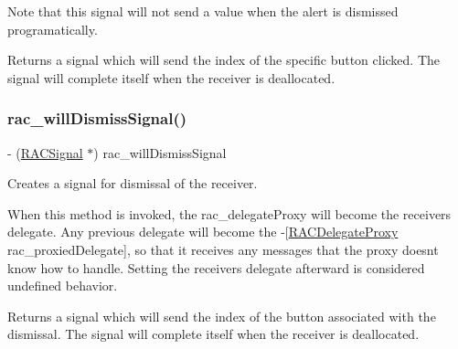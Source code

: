 Note that this signal will not send a value when the alert is dismissed programatically.

Returns a signal which will send the index of the specific button clicked. The signal will complete itself when the receiver is deallocated. \mbox{\label{category_u_i_alert_view_07_r_a_c_signal_support_08_aa0ae17a8658125f05c58f479cbaf2472}} 
\subsubsection{\texorpdfstring{rac\+\_\+will\+Dismiss\+Signal()}{rac\_willDismissSignal()}\hspace{0.1cm}{\footnotesize\ttfamily [1/3]}}
{\footnotesize\ttfamily -\/ (\mbox{\hyperlink{interface_r_a_c_signal}{R\+A\+C\+Signal}} $\ast$) rac\+\_\+will\+Dismiss\+Signal \begin{DoxyParamCaption}{ }\end{DoxyParamCaption}}

Creates a signal for dismissal of the receiver.

When this method is invoked, the {\ttfamily rac\+\_\+delegate\+Proxy} will become the receiver\textquotesingle{}s delegate. Any previous delegate will become the -\/\mbox{[}\mbox{\hyperlink{interface_r_a_c_delegate_proxy}{R\+A\+C\+Delegate\+Proxy}} rac\+\_\+proxied\+Delegate\mbox{]}, so that it receives any messages that the proxy doesn\textquotesingle{}t know how to handle. Setting the receiver\textquotesingle{}s {\ttfamily delegate} afterward is considered undefined behavior.

Returns a signal which will send the index of the button associated with the dismissal. The signal will complete itself when the receiver is deallocated. \mbox{\label{category_u_i_alert_view_07_r_a_c_signal_support_08_aa0ae17a8658125f05c58f479cbaf2472}} 
